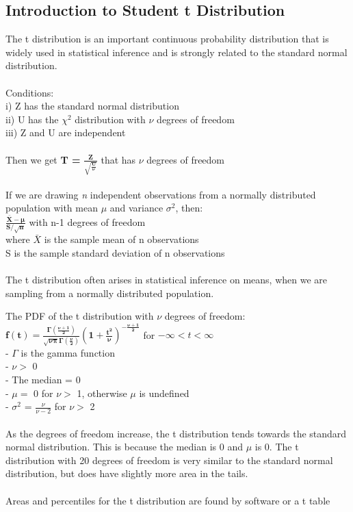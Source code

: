 \documentclass[12pt, a4paper]{article}
\begin{document}
	\subsection{Introduction to Student t Distribution}
	The t distribution is an important continuous probability distribution that is widely used in statistical inference and is strongly related to the standard normal distribution. \\~\\
	Conditions: \\
	i) Z has the standard normal distribution \\
	ii) U has the $\chi^2$ distribution with $\nu$ degrees of freedom \\
	iii) Z and U are independent \\~\\
	Then we get \large \textbf{T = } $\mathbf{\frac{Z}{\sqrt{\frac{U}{\nu}}}}$ \normalsize that has $\nu$ degrees of freedom \\~\\
	If we are drawing \textit{n} independent observations from a normally distributed population with mean $\mu$ and variance $\sigma^2$, then: \\
	\Large $\mathbf{\frac{\bar{X} - \mu}{S/\sqrt{n}}}$ \normalsize with n-1 degrees of freedom \\
	where $\bar{X}$ is the sample mean of n observations \\
	S is the sample standard deviation of n observations \\~\\
	The t distribution often arises in statistical inference on means, when we are sampling from a normally distributed population. \newpage
	
	\noindent The PDF of the t distribution with $\nu$ degrees of freedom: \\
	\Large $\mathbf{f(t) = \frac{\Gamma(\frac{\nu+1}{2})}{\sqrt{\nu\pi}\Gamma(\frac{\nu}{2})}(1+\frac{t^2}{\nu})^{-\frac{\nu+1}{2}}}$ \normalsize for $-\infty < t < \infty$ \\
	- $\Gamma$ is the gamma function \\
	- $\nu >$ 0 \\
	- The median = 0 \\
	- $\mu = $ 0 for $\nu >$ 1, otherwise $\mu$ is undefined \\
	- $\sigma^2$ = $\frac{\nu}{\nu-2}$ for $\nu >$ 2 \\~\\
	As the degrees of freedom increase, the t distribution tends towards the standard normal distribution. This is because the median is 0 and $\mu$ is 0. The t distribution with 20 degrees of freedom is very similar to the standard normal distribution, but does have slightly more area in the tails. \\~\\
	Areas and percentiles for the t distribution are found by software or a t table \\~\\ 
	
\end{document}
